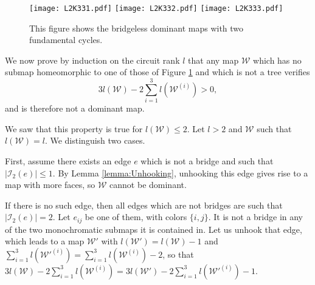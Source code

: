 \documentclass[aps,prd,10pt,notitlepage,nofootinbib,superscriptaddress,showkeys,showpacs]{revtex4-1}
\begin{document}
\begin{figure}
\texttt{[image: L2K331.pdf]}\hspace{3cm} \texttt{[image: L2K332.pdf]} \hspace{3cm}\texttt{[image: L2K333.pdf]} 
\caption{\label{fig:DomCells} This figure shows the bridgeless dominant maps with two fundamental cycles.}
\end{figure}

We now prove by induction on the circuit rank $l$ that any map ${\mathcal{W}}$ which has no submap homeomorphic to one of those of Figure \ref{fig:DomCells} and which is not a tree verifies
\begin{equation}
\label{eqref:InequK33}
3l({\mathcal{W}})-2\sum_{i=1}^3 l({\mathcal{W}}^{(i)})>0,
\end{equation}
and is therefore not a dominant map.

We saw that this property is true for $l({\mathcal{W}})\leq 2$. Let $l>2$ and ${\mathcal{W}}$ such that $l({\mathcal{W}})=l$. We distinguish two cases.

First, assume there exists an edge $e$ which is not a bridge and such that $\lvert{\mathcal{I}}_2(e)\rvert\leq 1$. By Lemma \ref{lemma:Unhooking}, unhooking this edge gives rise to a map with more faces, so ${\mathcal{W}}$ cannot be dominant.

If there is no such edge, then all edges which are not bridges are such that $|{\mathcal{I}}_2(e)| = 2$. Let $e_{ij}$ be one of them, with colors $\{i,j\}$. It is not a bridge in any of the two monochromatic submaps it is contained in. Let us unhook that edge, which leads to a map ${\mathcal{W}}'$ with $l({\mathcal{W}}') = l({\mathcal{W}}) - 1$ and $\sum_{i=1}^3 l({\mathcal{W}}'^{(i)}) = \sum_{i=1}^3 l({\mathcal{W}}^{(i)}) - 2$, so that $3 l({\mathcal{W}}) - 2 \sum_{i=1}^3 l({\mathcal{W}}^{(i)}) = 3 l({\mathcal{W}}') - 2\sum_{i=1}^3 l({\mathcal{W}}'^{(i)}) - 1$.
\end{document}
